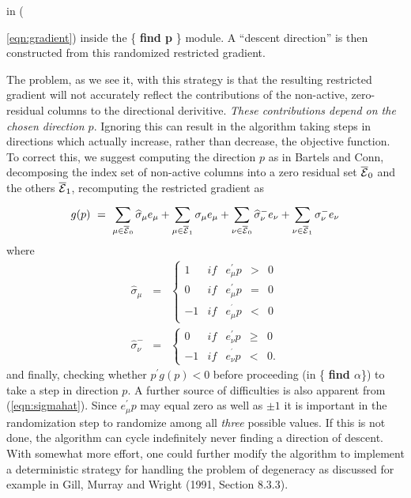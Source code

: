 in  ({\ref{eqn:gradient}) inside the \{ {\bf find p }\} module. 
A ``descent direction'' is then constructed from this randomized restricted 
gradient.

The problem, as we see it, with this strategy is that the resulting 
restricted gradient
will not accurately reflect the contributions of the non-active, 
zero-residual columns to the directional derivitive.  
{\it These contributions depend on the chosen direction $p$}.  
Ignoring this can result in the algorithm taking steps in 
directions which actually increase, rather
than decrease, the objective function.  To correct this, we suggest
computing the direction $p$ as in Bartels and Conn, 
decomposing the index set of  non-active columns into a zero residual set
$\overline { \cal {E}}_0$ and  the others
$\overline { \cal {E}}_1$, recomputing the restricted gradient as
\begin{equation}
\label{eqn:gradient1}
g(p) \ =\ \sum_{\mu \in \overline{{\cal E}}_0}^{}\widehat{%
\sigma }_\mu e_\mu +\sum_{\mu \in \overline{{\cal E}}_1}^{}\sigma _\mu e_\mu
+\sum_{\nu \in \overline{{\cal E}}_0}^{}\widehat{\sigma }_\nu ^{-}e_\nu
+\sum_{\nu \in \overline{{\cal E}}_1}^{}\sigma _\nu ^{-}e_\nu 
\end{equation}
where 
\begin{equation}
\label{eqn:sigmahat} 
\begin{array}{lll}
\widehat{\sigma }_\mu & = & \left\{ 
\begin{array}{lllll}
1 & if & e_\mu ^{\prime }p & > & 0 \\ 
0 & if & e_\mu ^{\prime }p & = & 0 \\ 
-1 & if & e_\mu ^{^{\prime }}p & < & 0 
\end{array}
\right. \\ 
\widehat{\sigma }_\nu ^{-} & = & \left\{ 
\begin{array}{lllll}
0 & if & e_\nu ^{\prime }p & \geq & 0 \\ 
-1 & if & e_\nu ^{^{\prime }}p & < & 0 .
\end{array}
\right. 
\end{array}
\end{equation}
and finally, checking whether  $p^{\prime}g(p) < 0$ before proceeding 
(in \{ {\bf {find $\alpha$}}\}) to take a step in direction $p$.
A further source of difficulties is also apparent from ({\ref{eqn:sigmahat}}).
Since $e_\mu^{\prime} p$ may equal zero as well as $\pm 1$
it is important in the randomization step to randomize among all {\it three}
possible values.  If this is not done, the algorithm can cycle
indefinitely never finding a direction of descent.  With somewhat more
effort, one could further modify the algorithm to implement a
deterministic strategy for handling the problem of degeneracy as
discussed for example in Gill, Murray and Wright (1991, Section 8.3.3).

}
